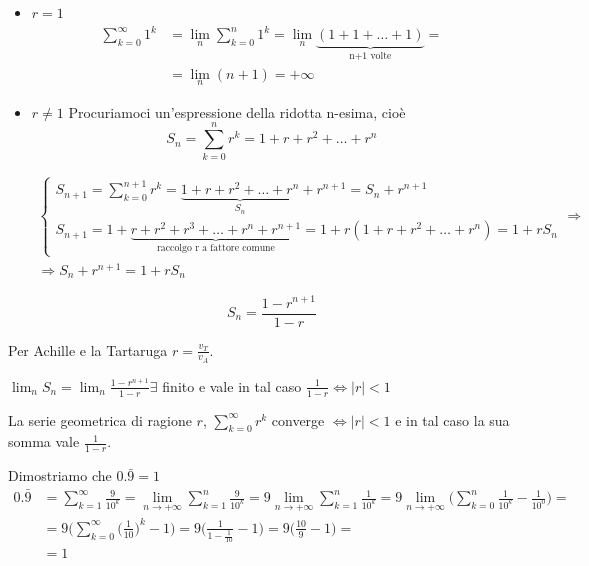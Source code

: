 \begin{itemize}
	\item $r=1$
	\begin{align*}
		\sum_{k=0}^\infty 1^k
		&= \lim_{n} \sum_{k=0}^n 1^k = \lim_{n} \underbrace{(1 + 1 + \ldots +1)}_\text{n+1 volte} = \\
		&=\lim_{n} (n+1) = +\infty
	\end{align*}
	
	\item $r\neq1$ \qquad Procuriamoci un'espressione della ridotta n-esima, cioè 
	\begin{equation*}
		S_n = \sum_{k=0}^n r^k = 1 + r + r^2 + \ldots + r^n
	\end{equation*}
	
	\begin{gather*}
		\begin{cases*}
			S_{n+1} = \sum_{k=0}^{n+1} r^k = \underbrace{1 + r + r^2 + \ldots + r^n}_\text{$S_n$} + r^{n+1} = S_n + r^{n+1} \\
			S_{n+1} = 1 + \underbrace{r + r^2 +r^3 + \ldots + r^n + r^{n+1}}_\text{raccolgo r a fattore comune} = 1 + r(1 + r + r^2 + \ldots + r^n) = 1 + rS_n
		\end{cases*}  \Rightarrow
		\\
		\Rightarrow S_n + r^{n+1} = 1 + rS_n
	\end{gather*}
	

	
	\begin{equation}
		S_n = \frac{1 - r^{n+1}}{1-r}
	\end{equation}
\end{itemize}

\begin{exbar}
	Per Achille e la Tartaruga $r=\frac{v_T}{v_A}$.
\end{exbar}

\begin{attbar}
	$\lim_{n} S_n = \lim_{n} \frac{1-r^{n+1}}{1-r} \exists$ finito e vale in tal caso $\frac{1}{1-r} \iff |r|<1$
\end{attbar}

\begin{attbar}
	La serie geometrica di ragione $r$, $\sum_{k=0}^\infty r^k$ converge $\iff |r|<1$ e in tal caso la sua somma vale $\frac{1}{1-r}$.
\end{attbar}

\begin{exbar}
	\begin{example} Dimostriamo che $0.\bar{9} = 1$
		\begin{align*}
			0.\bar{9} 
			&= \sum_{k=1}^\infty \frac{9}{10^k} = \lim_{n\rightarrow+\infty} \sum_{k=1}^n \frac{9}{10^k} = 9 \lim_{n\rightarrow+\infty} \sum_{k=1}^n \frac{1}{10^k} = 9 \lim_{n\rightarrow+\infty} \biggl( \sum_{k=0}^n \frac{1}{10^k} - \frac{1}{10^0} \biggr) = \\
			&= 9 \biggl( \sum_{k=0}^\infty \biggl(\frac{1}{10} \biggr)^k - 1 \biggr) = 9 \biggl( \frac{1}{1-\frac{1}{10}} -1 \biggr) = 9 \biggl( \frac{10}{9} -1 \biggr) = \\
			&=1
		\end{align*}	
	\end{example}
\end{exbar}

